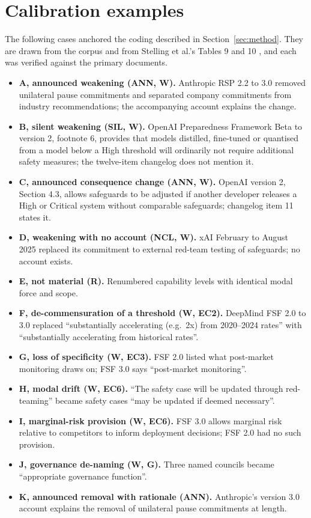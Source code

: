 \documentclass{article}
\begin{document}
\section{Calibration examples}
\label{apx:calibration}
The following cases anchored the coding described in Section~\ref{sec:method}. They are drawn from the corpus and from Stelling et al.'s Tables 9 and 10 \citep{stelling2025evaluating}, and each was verified against the primary documents.
\begin{itemize}[leftmargin=1.2em]
\item \textbf{A, announced weakening (ANN, W).} Anthropic RSP 2.2 to 3.0 removed unilateral pause commitments and separated company commitments from industry recommendations; the accompanying account explains the change.
\item \textbf{B, silent weakening (SIL, W).} OpenAI Preparedness Framework Beta to version 2, footnote 6, provides that models distilled, fine-tuned or quantised from a model below a High threshold will ordinarily not require additional safety measures; the twelve-item changelog does not mention it.
\item \textbf{C, announced consequence change (ANN, W).} OpenAI version 2, Section 4.3, allows safeguards to be adjusted if another developer releases a High or Critical system without comparable safeguards; changelog item 11 states it.
\item \textbf{D, weakening with no account (NCL, W).} xAI February to August 2025 replaced its commitment to external red-team testing of safeguards; no account exists.
\item \textbf{E, not material (R).} Renumbered capability levels with identical modal force and scope.
\item \textbf{F, de-commensuration of a threshold (W, EC2).} DeepMind FSF 2.0 to 3.0 replaced ``substantially accelerating (e.g.\ 2x) from 2020--2024 rates'' with ``substantially accelerating from historical rates''.
\item \textbf{G, loss of specificity (W, EC3).} FSF 2.0 listed what post-market monitoring draws on; FSF 3.0 says ``post-market monitoring''.
\item \textbf{H, modal drift (W, EC6).} ``The safety case will be updated through red-teaming'' became safety cases ``may be updated if deemed necessary''.
\item \textbf{I, marginal-risk provision (W, EC6).} FSF 3.0 allows marginal risk relative to competitors to inform deployment decisions; FSF 2.0 had no such provision.
\item \textbf{J, governance de-naming (W, G).} Three named councils became ``appropriate governance function''.
\item \textbf{K, announced removal with rationale (ANN).} Anthropic's version 3.0 account explains the removal of unilateral pause commitments at length.
\end{itemize}
\end{document}
